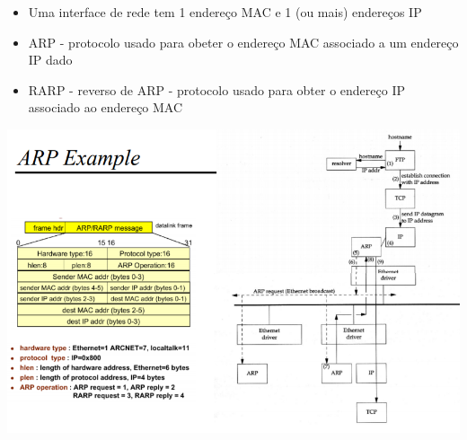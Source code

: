 \documentclass[../resumosRCOM.tex]{subfiles}
\begin{document}
\begin{itemize}
    \item Uma interface de rede tem 1 endereço MAC e 1 (ou mais) endereços IP
    \item ARP - protocolo usado para obeter o endereço MAC associado a um endereço IP dado
    \item RARP - reverso de ARP - protocolo usado para obter o endereço IP associado ao endereço MAC
\end{itemize}

\begin{center}
    \includegraphics[width=14cm]{images/RCOM24.png}
\end{center}
\end{document}
